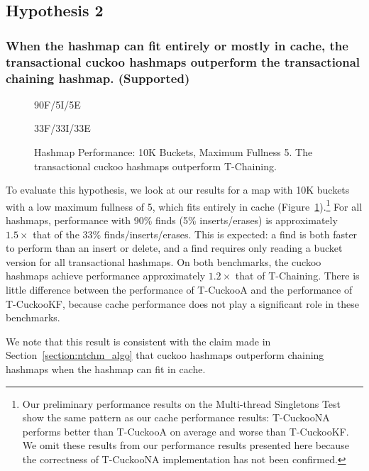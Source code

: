 \subsection{Hypothesis 2}
\subsubsection{When the hashmap can fit entirely or mostly in cache, the transactional cuckoo hashmaps outperform the transactional chaining hashmap. (Supported)}

\begin{figure}[ht!]
    \centering
    \begin{minipage}{0.75\textwidth}
	\caption*{90F/5I/5E}
        \vspace{12pt}
    \end{minipage}
    \begin{minipage}{0.75\textwidth}
	\caption*{33F/33I/33E}
    \end{minipage}
    \caption[Hashmap Performance: 10K Buckets, Maximum Fullness 5]{Hashmap Performance: 10K Buckets, Maximum Fullness 5. The transactional cuckoo hashmaps outperform T-Chaining.}
    \label{fig:hm_5}
\end{figure}


To evaluate this hypothesis, we look at our results for a map with 10K buckets with a low maximum fullness of 5, which fits entirely in cache (Figure~\ref{fig:hm_5}).\footnote{Our preliminary performance results on the Multi-thread Singletons Test show the same pattern as our cache performance results: T-CuckooNA performs better than T-CuckooA on average and worse than T-CuckooKF. We omit these results from our performance results presented here because the correctness of T-CuckooNA implementation has not been confirmed.}
For all hashmaps, performance with 90\% finds (5\% inserts/erases) is approximately $1.5\times$ that of the 33\% finds/inserts/erases. This is expected: a find is both faster to perform than an insert or delete, and a find requires only reading a bucket version for all transactional hashmaps.
On both benchmarks, the cuckoo hashmaps achieve performance approximately $1.2\times$ that of T-Chaining. There is little difference between the performance of T-CuckooA and the performance of T-CuckooKF, because cache performance does not play a significant role in these benchmarks.

We note that this result is consistent with the claim made in Section~\ref{section:ntchm_algo} that cuckoo hashmaps outperform chaining hashmaps when the hashmap can fit in cache. 

